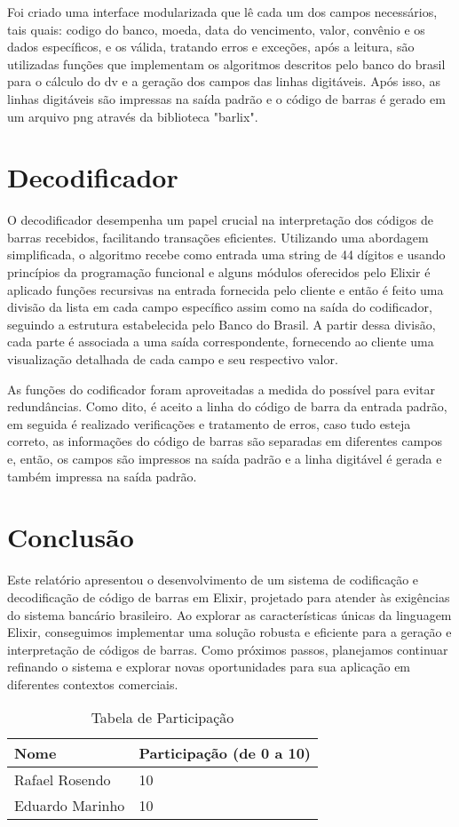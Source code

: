 \documentclass{article}
\begin{document}
Foi criado uma interface modularizada que lê cada um dos campos necessários, tais quais: codigo do banco, moeda, data do vencimento, valor, convênio e os dados específicos, e os válida, tratando erros e exceções, após a leitura, são utilizadas funções que implementam os algoritmos descritos pelo banco do brasil para o cálculo do dv e a geração dos campos das linhas digitáveis. Após isso, as linhas digitáveis são impressas na saída padrão e o código de barras é gerado em um arquivo png através da biblioteca "barlix".


\section{Decodificador}

O decodificador desempenha um papel crucial na interpretação dos códigos de barras recebidos, facilitando transações eficientes. Utilizando uma abordagem simplificada, o algoritmo recebe como entrada uma string de 44 dígitos e usando princípios da programação funcional e alguns módulos oferecidos pelo Elixir é aplicado funções recursivas na entrada fornecida pelo cliente e então é feito uma divisão da lista em cada campo específico assim como na saída do codificador, seguindo a estrutura estabelecida pelo Banco do Brasil. A partir dessa divisão, cada parte é associada a uma saída correspondente, fornecendo ao cliente uma visualização detalhada de cada campo e seu respectivo valor.  



As funções do codificador foram aproveitadas a medida do possível para evitar redundâncias. Como dito, é aceito a linha do código de barra da entrada padrão, em seguida é realizado verificações e tratamento de erros, caso tudo esteja correto, as informações do código de barras são separadas em diferentes campos e, então, os campos são impressos na saída padrão e a linha digitável é gerada e também impressa na saída padrão.

\section{Conclusão}

Este relatório apresentou o desenvolvimento de um sistema de codificação e decodificação de código de barras em Elixir, projetado para atender às exigências do sistema bancário brasileiro. Ao explorar as características únicas da linguagem Elixir, conseguimos implementar uma solução robusta e eficiente para a geração e interpretação de códigos de barras. Como próximos passos, planejamos continuar refinando o sistema e explorar novas oportunidades para sua aplicação em diferentes contextos comerciais. 



\begin{table}[htbp]
  \centering
  \caption{Tabela de Participação}
  \begin{tabular}{ll}
    \toprule
    \textbf{Nome} & \textbf{Participação (de 0 a 10)} \\
    \midrule
    Rafael Rosendo & 10 \\
    Eduardo Marinho & 10 \\
    \bottomrule
  \end{tabular}
\end{table}
\end{document}
